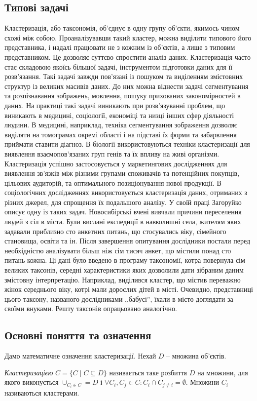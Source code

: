 \subsection{Типові задачі}
Кластеризація, або таксономія, об'єднує в одну групу об'єкти, якимось чином схожі між собою. Проаналізувавши такий кластер, можна виділити типового його представника, і надалі працювати не з кожним із об'єктів, а лише з типовим представником. Це дозволяє суттєво спростити аналіз даних. Кластеризація часто стає складовою якоїсь більшої задачі, інструментом підготовки даних для її розв'язання. Такі задачі завжди пов'язані із пошуком та виділенням змістовних структур із великих масивів даних. 
До них можна віднести задачі сегментування та розпізнавання зображень, мовлення, пошуку прихованих закономірностей в даних. На практиці такі задачі виникають при розв'язуванні проблем, що виникають в медицині, соціології, економіці та низці інших сфер діяльності людини. 
В медицині, наприклад, техніка сегментування зображення дозволяє виділяти на томограмах окремі області і на підставі їх форми та забарвлення приймати ставити діагноз. В біології використовуються техніки кластеризації для виявлення взаємопов'язаних груп генів та їх впливу на живі організми.
Кластеризація успішно застосовується у маркетингових дослідженнях для виявлення зв'язків між різними групами споживачів та потенційних покупців, цільових аудиторій, та оптимального позиціонування нової продукції. В соціологічних дослідженнях використовується кластеризація даних, отриманих з різних джерел, для спрощення їх подальшого аналізу. 
У своїй праці \cite{Zagorujko} Загоруйко описує одну із таких задач. Новосибірські вчені вивчали причини переселення людей з сіл в міста. Були вислані експедиції в навколишні села, жителям яких задавали приблизно сто анкетних питань, що стосувались віку, сімейного становища, освіти та ін. Після завершення опитування дослідники постали перед необхідністю аналізувати більш ніж сім тисяч анкет, що містили понад сто питань кожна. Ці дані було введено в програму таксономії, котра повернула сім великих таксонів, середні характеристики яких дозволили дати зібраним даним змістовну інтерпретацію. Наприклад, виділився кластер, що містив переважно жінок середнього віку, котрі мали дорослих дітей в місті. Очевидно, представниці цього таксону, названого дослідниками ,,бабусі'', їхали в місто доглядати за своїми внуками. Решту таксонів опрацьовано аналогічно.

\subsection{Основні поняття та означення}
Дамо математичне означення кластеризації. Нехай $D$ -- множина об'єктів. 
\begin{definition}
    \emph{Кластеризацією} $C = \{C \mid C \subseteq D\}$ називається таке розбиття $D$ на множини, для якого виконується $\cup_{C_i \in C} = D$ і $\forall C_i, C_j \in C : C_i \cap C_{j \neq i} = \emptyset$. 
    Множини $C_i$ називаються кластерами.
\end{definition}
